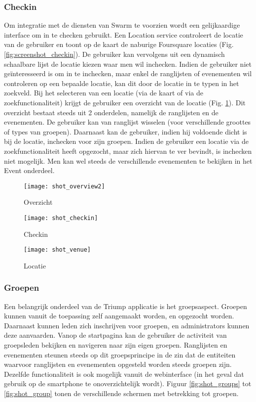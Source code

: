 \subsubsection{Checkin}%
Om integratie met de diensten van Swarm te voorzien wordt een gelijkaardige interface om in te checken gebruikt. Een Location service controleert de locatie van de gebruiker en toont op de kaart de naburige Foursquare locaties (Fig. \ref{fig:screenshot_checkin}). De gebruiker kan vervolgens uit een dynamisch schaalbare lijst de locatie kiezen waar men wil inchecken. Indien de gebruiker niet geïnteresseerd is om in te inchecken, maar enkel de ranglijsten of evenementen wil controleren op een bepaalde locatie, kan dit door de locatie in te typen in het zoekveld. Bij het selecteren van een locatie (via de kaart of via de zoekfunctionaliteit) krijgt de gebruiker een overzicht van de locatie (Fig. \ref{fig:screenshot_venue}). Dit overzicht bestaat steeds uit 2 onderdelen, namelijk de ranglijsten en de evenementen. De gebruiker kan van ranglijst wisselen (voor verschillende groottes of types van groepen). Daarnaast kan de gebruiker, indien hij voldoende dicht is bij de locatie, inchecken voor zijn groepen. Indien de gebruiker een locatie via de zoekfunctionaliteit heeft opgezocht, maar zich hiervan te ver bevindt, is inchecken niet mogelijk. Men kan wel steeds  de verschillende evenementen te bekijken in het Event onderdeel.
\begin{figure}[ht]
\begin{minipage}[b]{0.25\linewidth}
\centering
\texttt{[image: shot\_overview2]}
\caption{Overzicht}
\label{fig:screenshot_overview2}
\end{minipage}
\hspace{1.5cm}
\begin{minipage}[b]{0.25\linewidth}
\centering
\texttt{[image: shot\_checkin]}
\caption{Checkin}
\label{fig:screenshot_checkin}
\end{minipage}
\hspace{1.5cm}
\begin{minipage}[b]{0.25\linewidth}
\centering
\texttt{[image: shot\_venue]}
\caption{Locatie}
\label{fig:screenshot_venue}
\end{minipage}
\end{figure}
\clearpage
\subsubsection{Groepen}%
Een belangrijk onderdeel van de Triump applicatie is het groepsaspect. Groepen kunnen vanuit de toepassing zelf aangemaakt worden, en opgezocht worden. Daarnaast kunnen leden zich inschrijven voor groepen, en administrators kunnen deze aanvaarden. Vanop de startpagina kan de gebruiker de activiteit van groepsleden bekijken en navigeren naar zijn eigen groepen. Ranglijsten en evenementen steunen steeds op dit groepsprincipe in de zin dat de entiteiten waarvoor ranglijsten en evenementen opgesteld worden steeds groepen zijn. Dezelfde functionaliteit is ook mogelijk vanuit de webinterface (in het geval dat gebruik op de smartphone te onoverzichtelijk wordt).
Figuur \ref{fig:shot_groups} tot \ref{fig:shot_group} tonen de verschillende schermen met betrekking tot groepen.

